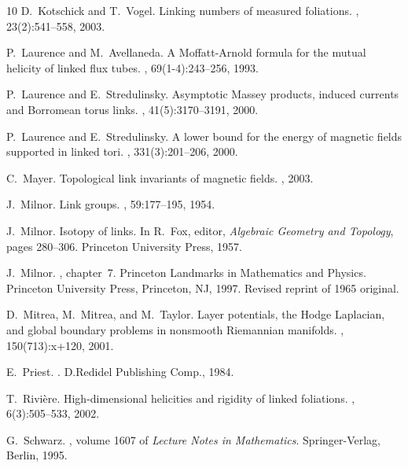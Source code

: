 \documentclass[12pt]{article}
\numberwithin{equation}{section}
\begin{document}
\begin{thebibliography}{10}
D.~Kotschick and T.~Vogel.
\newblock Linking numbers of measured foliations.
, 23(2):541--558, 2003.

P.~Laurence and M.~Avellaneda.
\newblock A {M}offatt-{A}rnold formula for the mutual helicity of linked flux
  tubes.
, 69(1-4):243--256, 1993.

P.~Laurence and E.~Stredulinsky.
\newblock Asymptotic {M}assey products, induced currents and {B}orromean torus
  links.
, 41(5):3170--3191, 2000.

P.~Laurence and E.~Stredulinsky.
\newblock A lower bound for the energy of magnetic fields supported in linked
  tori.
, 331(3):201--206, 2000.

C.~Mayer.
\newblock Topological link invariants of magnetic fields.
, 2003.

J.~Milnor.
\newblock Link groups.
, 59:177--195, 1954.

J.~Milnor.
\newblock Isotopy of links.
\newblock In R.~Fox, editor, {\em Algebraic Geometry and Topology}, pages
  280--306. Princeton University Press, 1957.

J.~Milnor.
, chapter~7.
\newblock Princeton Landmarks in Mathematics and Physics. Princeton University
  Press, Princeton, NJ, 1997.
\newblock Revised reprint of 1965 original.

D.~Mitrea, M.~Mitrea, and M.~Taylor.
\newblock Layer potentials, the {H}odge {L}aplacian, and global boundary
  problems in nonsmooth {R}iemannian manifolds.
, 150(713):x+120, 2001.

E.~Priest.
.
\newblock D.Redidel Publishing Comp., 1984.

T.~Rivi{\`e}re.
\newblock High-dimensional helicities and rigidity of linked foliations.
, 6(3):505--533, 2002.

G.~Schwarz.
, volume 1607 of {\em Lecture Notes in Mathematics}.
\newblock Springer-Verlag, Berlin, 1995.


\end{thebibliography}
\end{document}
